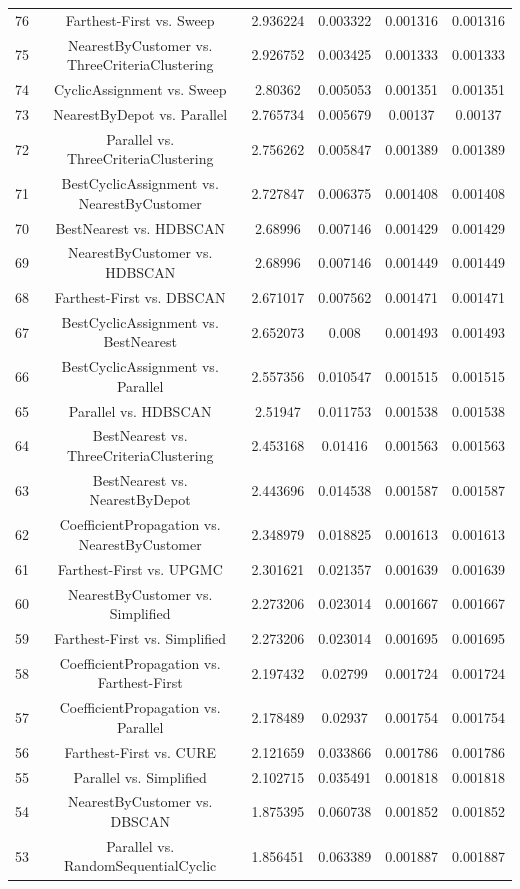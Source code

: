\documentclass[a4paper,10pt]{article}
\begin{document}
\begin{landscape}
\begin{table}[!htp]
\begin{tabular}{cccccc}
76&Farthest-First vs. Sweep&2.936224&0.003322&0.001316&0.001316\\
75&NearestByCustomer vs. ThreeCriteriaClustering&2.926752&0.003425&0.001333&0.001333\\
74&CyclicAssignment vs. Sweep&2.80362&0.005053&0.001351&0.001351\\
73&NearestByDepot vs. Parallel&2.765734&0.005679&0.00137&0.00137\\
72&Parallel vs. ThreeCriteriaClustering&2.756262&0.005847&0.001389&0.001389\\
71&BestCyclicAssignment vs. NearestByCustomer&2.727847&0.006375&0.001408&0.001408\\
70&BestNearest vs. HDBSCAN&2.68996&0.007146&0.001429&0.001429\\
69&NearestByCustomer vs. HDBSCAN&2.68996&0.007146&0.001449&0.001449\\
68&Farthest-First vs. DBSCAN&2.671017&0.007562&0.001471&0.001471\\
67&BestCyclicAssignment vs. BestNearest&2.652073&0.008&0.001493&0.001493\\
66&BestCyclicAssignment vs. Parallel&2.557356&0.010547&0.001515&0.001515\\
65&Parallel vs. HDBSCAN&2.51947&0.011753&0.001538&0.001538\\
64&BestNearest vs. ThreeCriteriaClustering&2.453168&0.01416&0.001563&0.001563\\
63&BestNearest vs. NearestByDepot&2.443696&0.014538&0.001587&0.001587\\
62&CoefficientPropagation vs. NearestByCustomer&2.348979&0.018825&0.001613&0.001613\\
61&Farthest-First vs. UPGMC&2.301621&0.021357&0.001639&0.001639\\
60&NearestByCustomer vs. Simplified&2.273206&0.023014&0.001667&0.001667\\
59&Farthest-First vs. Simplified&2.273206&0.023014&0.001695&0.001695\\
58&CoefficientPropagation vs. Farthest-First&2.197432&0.02799&0.001724&0.001724\\
57&CoefficientPropagation vs. Parallel&2.178489&0.02937&0.001754&0.001754\\
56&Farthest-First vs. CURE&2.121659&0.033866&0.001786&0.001786\\
55&Parallel vs. Simplified&2.102715&0.035491&0.001818&0.001818\\
54&NearestByCustomer vs. DBSCAN&1.875395&0.060738&0.001852&0.001852\\
53&Parallel vs. RandomSequentialCyclic&1.856451&0.063389&0.001887&0.001887\\

\end{tabular}
\end{table}
\end{landscape}
\end{document}
